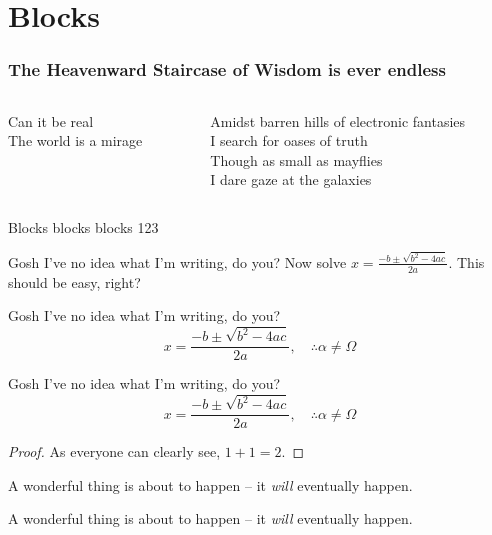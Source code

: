 \documentclass[aspectratio=1610]{beamer}
\begin{document}
\section{Blocks}

\begin{frame}[c]
\frametitle{The Heavenward Staircase of Wisdom is ever endless}
\begin{columns}
\begin{column}[b]{.35\textwidth}
\begin{pullquote}
    Can it be real\\
    The world is a mirage
\end{pullquote}
\end{column}

\begin{column}[t]{.65\textwidth}
\renewcommand{\MiragePullquoteOpen}{«}
\begin{pullquote}
Amidst barren hills of electronic fantasies\\
I search for oases of truth\\
Though as small as mayflies\\
I dare gaze at the galaxies
\end{pullquote}
\end{column}
\end{columns}
\end{frame}



\begin{frame}[allowframebreaks]{Blocks blocks blocks 123}

    \begin{exampleblock}{Gosh I've no idea what I'm writing, do you?}
    Now solve $x = \frac{-b \pm \sqrt{b^2 -4ac}}{2a}$. This should be easy, right?
    \end{exampleblock}

    \begin{alertblock}{Gosh I've no idea what I'm writing, do you?}
    \[ x = \frac{-b \pm \sqrt{b^2 -4ac}}{2a}, \quad\therefore \alpha \neq \Omega \]
    \end{alertblock}

    \begin{block}{Gosh I've no idea what I'm writing, do you?}
    \[ x = \frac{-b \pm \sqrt{b^2 -4ac}}{2a}, \quad\therefore \alpha \neq \Omega \]
    \end{block}
    
    \begin{proof}
    As everyone can clearly see, $1+1=2$.
    \end{proof}

    \begin{theorem}
    A wonderful thing is about to happen -- it \emph{will} eventually happen.
    \end{theorem}
    
    \begin{definition}
    A wonderful thing is about to happen -- it \emph{will} eventually happen.
    \end{definition}
\end{frame}
\end{document}
